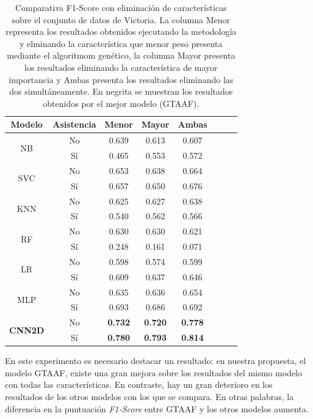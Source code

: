 \documentclass{uathesis-es}
\begin{document}
{\begin{table}[H]
\begin{center}
\begin{tabular}{|c|c||c|c|c|c|c|c|}
		\textbf{Modelo} & Asistencia & Menor & Mayor & Ambas
		\\ \hline \hline

        \multirow{2}{*}{NB} &
            No & 0.639 & 0.613 & 0.607\\ &
		    Sí  & 0.465 & 0.553 & 0.572 \\ \hline \hline
        \multirow{2}{*}{SVC} &
            No & 0.653 & 0.638 & 0.664\\ &
		    Sí  & 0.657 & 0.650 & 0.676 \\ \hline \hline
        \multirow{2}{*}{KNN} &
            No & 0.625 & 0.627 & 0.638\\ &
		    Sí  & 0.540 & 0.562 & 0.566 \\ \hline \hline
        \multirow{2}{*}{RF} &
            No & 0.630 & 0.630 & 0.621\\ &
		    Sí  & 0.248 & 0.161 & 0.071 \\ \hline \hline
        \multirow{2}{*}{LR} &
            No & 0.598 & 0.574 & 0.599\\ &
		    Sí  & 0.609 & 0.637 & 0.646 \\ \hline \hline
        \multirow{2}{*}{MLP} &
            No & 0.635 & 0.636 & 0.654\\ &
		    Sí  & 0.693 & 0.686 & 0.692 \\ \hline \hline
        \multirow{2}{*}{\textbf{CNN2D}} &
            No & \textbf{0.732} & \textbf{0.720} & \textbf{0.778}\\ &
		    Sí  & \textbf{0.780} & \textbf{0.793} & \textbf{0.814} \\ \hline \hline
		\end{tabular}
	\end{center}
	\caption{Comparativa F1-Score con eliminación de características sobre el conjunto de datos de Victoria. La columna Menor representa los resultados obtenidos ejecutando la metodología y elminando la característica que menor peso presenta mediante el algoritmom genético, la columna Mayor presenta los resultados eliminando la característica de mayor importancia y Ambas presenta los resultados eliminando las dos simultáneamente. En negrita se muestran los resultados obtenidos por el mejor modelo (GTAAF).}
	\label{Victorialoss}
\end{table}

En este experimento es necesario destacar un resultado: en nuestra propuesta, el modelo GTAAF, existe una gran mejora sobre los resultados del mismo modelo con todas las características. En contraste, hay un gran deterioro en los resultados de los otros modelos con los que se compara. En otras palabras, la diferencia en la puntuación \textit{F1-Score} entre GTAAF y los otros modelos aumenta.

}
\end{document}

